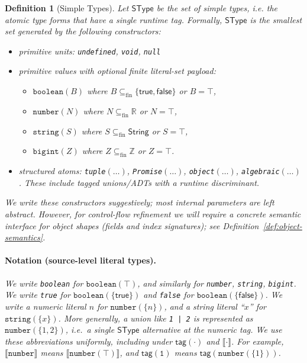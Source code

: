 \documentclass[11pt]{article}
\newtheorem{definition}[theorem]{Definition}
\newcommand{\sem}[1]{\llbracket #1 \rrbracket}
\newcommand{\String}{\mathsf{String}}
\newcommand{\SType}{\mathsf{SType}}
\newcommand{\tagfn}{\mathsf{tag}}
\begin{document}
\begin{definition}[Simple Types]
\label{def:simple-types}
Let $\SType$ be the set of \emph{simple types}, i.e. the atomic type forms that have a single runtime tag.
Formally, $\SType$ is the smallest set generated by the following constructors:
\begin{itemize}
\item primitive units: \texttt{undefined}, \texttt{void}, \texttt{null}
\item primitive values with optional finite literal-set payload:
  \begin{itemize}
  \item \(\texttt{boolean}(B)\) where \(B \subseteq_{\mathrm{fin}} \{\mathsf{true},\mathsf{false}\}\) or \(B=\top\),
  \item \(\texttt{number}(N)\) where \(N \subseteq_{\mathrm{fin}} \mathbb{R}\) or \(N=\top\),
  \item \(\texttt{string}(S)\) where \(S \subseteq_{\mathrm{fin}} \String\) or \(S=\top\),
  \item \(\texttt{bigint}(Z)\) where \(Z \subseteq_{\mathrm{fin}} \mathbb{Z}\) or \(Z=\top\).
  \end{itemize}
\item structured atoms: \texttt{tuple}$(\ldots)$, \texttt{Promise}$(\ldots)$, \texttt{object}$(\ldots)$, \texttt{algebraic}$(\ldots)$.
  These include tagged unions/ADTs with a runtime discriminant.
\end{itemize}
We write these constructors suggestively; most internal parameters are left abstract.
However, for control-flow refinement we will require a concrete semantic interface for object shapes (fields and index signatures); see Definition~\ref{def:object-semantics}.
\paragraph{Notation (source-level literal types).}
We write \texttt{boolean} for \(\texttt{boolean}(\top)\), and similarly for \texttt{number}, \texttt{string}, \texttt{bigint}.
We write \texttt{true} for \(\texttt{boolean}(\{\mathsf{true}\})\) and \texttt{false} for \(\texttt{boolean}(\{\mathsf{false}\})\).
We write a numeric literal \(n\) for \(\texttt{number}(\{n\})\), and a string literal ``\(x\)'' for \(\texttt{string}(\{x\})\).
More generally, a union like \texttt{1 | 2} is represented as \(\texttt{number}(\{1,2\})\), i.e.\ a single \(\SType\) alternative at the numeric tag.
We use these abbreviations uniformly, including under \(\tagfn(\cdot)\) and \(\sem{\cdot}\).
For example, \(\sem{\texttt{number}}\) means \(\sem{\texttt{number}(\top)}\), and \(\tagfn(\texttt{1})\) means \(\tagfn(\texttt{number}(\{1\}))\).
\end{definition}
\end{document}
